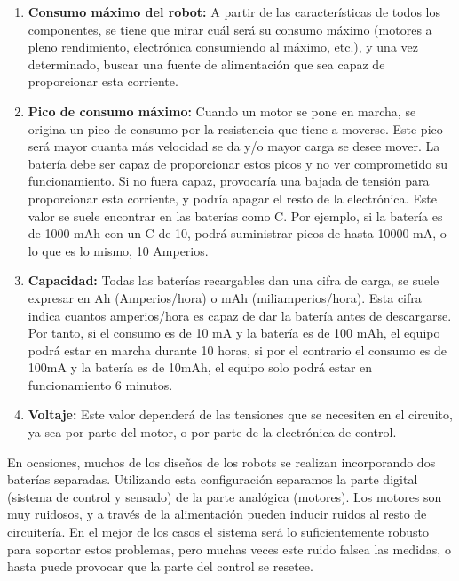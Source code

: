 \begin{enumerate}

 \item \textbf{Consumo máximo del robot:} A partir de las características de todos los
componentes, se tiene que mirar cuál será su consumo máximo (motores a pleno
rendimiento, electrónica consumiendo al máximo, etc.), y una vez determinado,
buscar una fuente de alimentación que sea capaz de proporcionar esta corriente.

\item \textbf{Pico de consumo máximo:} Cuando un motor se pone en marcha, se origina un
pico de consumo por la resistencia que tiene a moverse. Este pico será mayor
cuanta más velocidad se da y/o mayor carga se desee mover. La batería debe ser
capaz de proporcionar estos picos y no ver comprometido su funcionamiento. Si no
fuera capaz, provocaría una bajada de tensión para proporcionar esta corriente, y
podría apagar el resto de la electrónica. Este valor se suele encontrar en las
baterías como C. Por ejemplo, si la batería es de 1000 mAh con un C de 10, podrá
suministrar picos de hasta 10000 mA, o lo que es lo mismo, 10 Amperios.


\item \textbf{Capacidad:} Todas las baterías recargables dan una cifra de carga, se suele
expresar en Ah (Amperios/hora) o mAh (miliamperios/hora). Esta cifra indica
cuantos amperios/hora es capaz de dar la batería antes de descargarse. Por tanto,
si el consumo es de 10 mA y la batería es de 100 mAh, el equipo podrá estar en
marcha durante 10 horas, si por el contrario el consumo es de 100mA y la batería
es de 10mAh, el equipo solo podrá estar en funcionamiento 6 minutos.

\item \textbf{Voltaje:} Este valor dependerá de las tensiones que se necesiten en el circuito, ya
sea por parte del motor, o por parte de la electrónica de control.

\end{enumerate}

En ocasiones, muchos de los diseños de los robots se realizan incorporando dos baterías separadas. Utilizando esta configuración separamos la
parte digital (sistema de control y sensado) de la parte analógica (motores). Los motores son muy ruidosos, y a través de la alimentación pueden inducir ruidos
al resto de circuitería. En el mejor de los casos el sistema será lo suficientemente robusto para soportar estos problemas, pero muchas
veces este ruido falsea las medidas, o hasta puede provocar que la parte del control se resetee.\\

